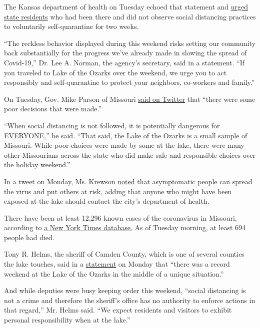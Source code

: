 The Kansas department of health on Tuesday echoed that statement and
\href{https://khap2.kdhe.state.ks.us/NewsRelease/PDFs/5-26-20\%20Ozarks.pdf}{urged
state residents} who had been there and did not observe social
distancing practices to voluntarily self-quarantine for two weeks.

``The reckless behavior displayed during this weekend risks setting our
community back substantially for the progress we've already made in
slowing the spread of Covid-19,'' Dr. Lee A. Norman, the agency's
secretary, said in a statement. ``If you traveled to Lake of the Ozarks
over the weekend, we urge you to act responsibly and self-quarantine to
protect your neighbors, co-workers and family.''

On Tuesday, Gov. Mike Parson of Missouri
\href{https://twitter.com/GovParsonMO/status/1265373360424353795}{said
on Twitter} that ``there were some poor decisions that were made.''

``When social distancing is not followed, it is potentially dangerous
for EVERYONE,'' he said. ``That said, the Lake of the Ozarks is a small
sample of Missouri. While poor choices were made by some at the lake,
there were many other Missourians across the state who did make safe and
responsible choices over the holiday weekend.''

In a tweet on Monday, Ms. Krewson
\href{https://twitter.com/LydaKrewson/status/1265084581423853568}{noted}
that asymptomatic people can spread the virus and put others at risk,
adding that anyone who might have been exposed at the lake should
contact the city's department of health.

There have been at least 12,296 known cases of the coronavirus in
Missouri, according to
\href{https://www.nytimes3xbfgragh.onion/interactive/2020/us/missouri-coronavirus-cases.html}{a
New York Times database.} As of Tuesday morning, at least 694 people had
died.

Tony R. Helms, the sheriff of Camden County, which is one of several
counties the lake touches, said in a
\href{https://www.facebookcorewwwi.onion/CamdenCountyMOSheriff/photos/a.409568172612/10157535587077613/}{statement}
on Monday that ``there was a record weekend at the Lake of the Ozarks in
the middle of a unique situation.''

And while deputies were busy keeping order this weekend, ``social
distancing is not a crime and therefore the sheriff's office has no
authority to enforce actions in that regard,'' Mr. Helms said. ``We
expect residents and visitors to exhibit personal responsibility when at
the lake.''


